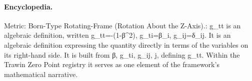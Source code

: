 \paragraph{Encyclopedia.}
Metric: Born-Type Rotating-Frame (Rotation About the Z-Axis).: g\_tt is an algebraic definition, written g\_tt=-(1-β\textasciicircum{}2), g\_ti=β\_i, g\_ij=δ\_ij. It is an algebraic definition expressing the quantity directly in terms of the variables on its right-hand side. It is built from β, g\_ti, g\_ij, j, defining g\_tt. Within the Trawin Zero Point registry it serves as one element of the framework's mathematical narrative.
